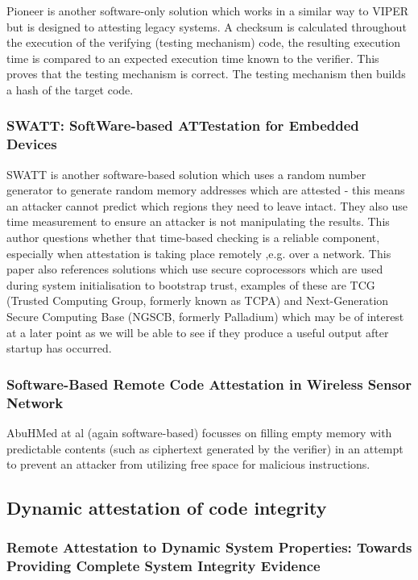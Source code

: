 Pioneer \cite{Seshadri2007} is another software-only solution which works in a similar way to VIPER but is designed to attesting legacy systems. A checksum is calculated throughout the execution of the verifying (testing mechanism) code, the resulting execution time is compared to an expected execution time known to the verifier. This proves that the testing mechanism is correct. The testing mechanism then builds a hash of the target code.

\subsubsection{SWATT: SoftWare-based ATTestation for Embedded Devices}

SWATT \cite{Seshadri2004} is another software-based solution which uses a random number generator to generate random memory addresses which are attested - this means an attacker cannot predict which regions they need to leave intact. They also use time measurement to ensure an attacker is not manipulating the results. This author questions whether that time-based checking is a reliable component, especially when attestation is taking place remotely ,e.g. over a network.
\ifnotesincluded
{} 
\fi
This paper also references solutions which use secure coprocessors which are used during system initialisation to bootstrap trust, examples of these are TCG (Trusted Computing Group, formerly known as TCPA) and Next-Generation Secure Computing Base (NGSCB, formerly Palladium) which may be of interest at a later point as we will be able to see if they produce a useful output after startup has occurred.

\subsubsection{Software-Based Remote Code Attestation in Wireless Sensor Network}

AbuHMed at al \cite{AbuHmed2009} (again software-based) focusses on filling empty memory with predictable contents (such as ciphertext generated by the verifier) in an attempt to prevent an attacker from utilizing free space for malicious instructions.

\subsection{Dynamic attestation of code integrity} \label{dynamicAttestationSolutions}

\subsubsection{Remote Attestation to Dynamic System Properties: Towards Providing Complete System Integrity Evidence}

